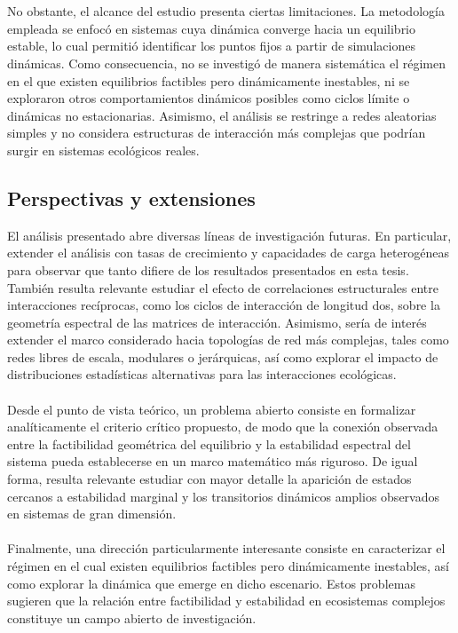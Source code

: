 \\
\\
No obstante, el alcance del estudio presenta ciertas limitaciones. La metodología empleada se enfocó en sistemas cuya dinámica converge hacia un equilibrio estable, lo cual permitió identificar los puntos fijos a partir de simulaciones dinámicas. Como consecuencia, no se investigó de manera sistemática el régimen en el que existen equilibrios factibles pero dinámicamente inestables, ni se exploraron otros comportamientos dinámicos posibles como ciclos límite o dinámicas no estacionarias. Asimismo, el análisis se restringe a redes aleatorias simples y no considera estructuras de interacción más complejas que podrían surgir en sistemas ecológicos reales.

\subsection*{Perspectivas y extensiones}

El análisis presentado abre diversas líneas de investigación futuras. En particular, extender el análisis con tasas de crecimiento y capacidades de carga heterogéneas para observar que tanto difiere de los resultados presentados en esta tesis. También resulta relevante estudiar el efecto de correlaciones estructurales entre interacciones recíprocas, como los ciclos de interacción de longitud dos, sobre la geometría espectral de las matrices de interacción. Asimismo, sería de interés extender el marco considerado hacia topologías de red más complejas, tales como redes libres de escala, modulares o jerárquicas, así como explorar el impacto de distribuciones estadísticas alternativas para las interacciones ecológicas.
\\
\\
Desde el punto de vista teórico, un problema abierto consiste en formalizar analíticamente el criterio crítico propuesto, de modo que la conexión observada entre la factibilidad geométrica del equilibrio y la estabilidad espectral del sistema pueda establecerse en un marco matemático más riguroso. De igual forma, resulta relevante estudiar con mayor detalle la aparición de estados cercanos a estabilidad marginal y los transitorios dinámicos amplios observados en sistemas de gran dimensión.
\\
\\
Finalmente, una dirección particularmente interesante consiste en caracterizar el régimen en el cual existen equilibrios factibles pero dinámicamente inestables, así como explorar la dinámica que emerge en dicho escenario. Estos problemas sugieren que la relación entre factibilidad y estabilidad en ecosistemas complejos constituye un campo abierto de investigación.


